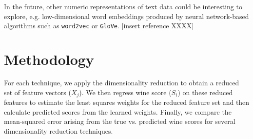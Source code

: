 \documentclass{article}
\begin{document}
In the future, other numeric representations of text data could be interesting to explore, e.g. low-dimensional word embeddings produced by neural network-based algorithms such as \verb+word2vec+ or \verb+GloVe+. [insert reference XXXX] 
\section{Methodology}
For each technique, we apply the dimensionality reduction to obtain a reduced set of feature vectors ($X_j$). We then regress wine score ($S_i$) on these reduced features to estimate the least squares weights for the reduced feature set and then calculate predicted scores from the learned weights. Finally, we compare the mean-squared error arising from the true vs. predicted wine scores for several dimensionality reduction techniques.
\end{document}
